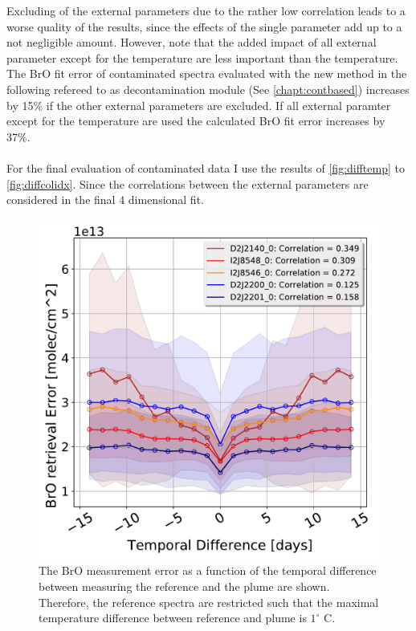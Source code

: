 \documentclass  [
  paper    = a4,
  BCOR     = 10mm,
  twoside,
  fontsize = 12pt,
  fleqn,
  toc      = bibnumbered,
  toc      = listofnumbered,
  numbers  = noendperiod,
  headings = normal,
  listof   = leveldown,
  version  = 3.03
]                                       {scrreprt}
\begin{document}
	Excluding of the external parameters due to the rather low correlation leads to a worse quality of the results, since the effects of the single parameter add up to a not negligible amount. However, note that  the added impact of all external parameter except for the temperature are less important than the temperature.
	The BrO fit error of contaminated spectra evaluated with the new method in the following refereed to as decontamination module (See \cref{chapt:contbased}) increases by 15\% if the other external parameters are excluded. If all external paramter except for the temperature are used the calculated BrO fit error increases by 37\%.\\
	\\
	For the final evaluation of contaminated data I use the results of \cref{fig:difftemp} to \cref{fig:diffcolidx}. Since the correlations between the external parameters are considered in the final 4 dimensional fit.\\
	\begin{figure}[h]
		\centering
		\includegraphics[width=0.5\linewidth]{Bilder/BrOErr_OhnEVar/DatwithoutOtherparamallInstruments}
		\caption{The BrO measurement error as a function of the temporal difference between measuring the reference and the plume are shown. Therefore, the reference spectra are restricted such that the maximal temperature difference between reference and plume is $1^\circ$ C.}
		\label{fig:datwithoutotherparamallinstruments}
	\end{figure}
\end{document}
